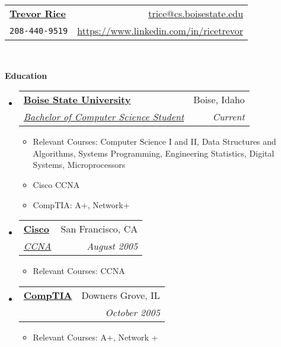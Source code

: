 \documentclass[letterpaper,11pt]{article}
\makeatletter
\newcommand{\resitem}[1]{\item #1 \vspace{-2pt}}
\newcommand{\resheading}[1]{{\large
    \colorbox{mygrey}{\begin{minipage}{\textwidth}{\textbf{#1
            \vphantom{p\^{E}}}}\end{minipage}}}}
\newcommand{\ressubheading}[4]{

  \begin{tabular*}{6.5in}{l@{\extracolsep{\fill}}r}
    \textbf{#1} & #2 \\
    \textit{#3} & \textit{#4} \\
  \end{tabular*}\vspace{-6pt}}
\makeatother
\begin{document}
\newcommand{\mywebheader}{
  \begin{tabular*}{7in}{l@{\extracolsep{\fill}}r}
    \textbf{\href{https://www.linkedin.com/in/ricetrevor}
    {\LARGE Trevor Rice}} & \href{mailto:trice@cs.boisestate.edu}{trice@cs.boisestate.edu}\\
    {\footnotesize \texttt{208-440-9519}} &
    \href{https://www.linkedin.com/in/ricetrevor} {https://www.linkedin.com/in/ricetrevor} \\
  \end{tabular*}
  \\
  \vspace{0.1in}}

\mywebheader

\resheading{Education}
\begin{itemize}
\item \ressubheading{\href{http://www.boisestate.edu}
		{Boise State University }}
		{Boise, Idaho }
		{\href{http://cs.boisestate.edu}
		{Bachelor of Computer Science Student}}
		{Current}
		{ \footnotesize
    \begin{itemize}
				\resitem{Relevant Courses: Computer Science I and II, Data Structures and
					Algorithms, Systems Programming, Engineering Statistics, Digital Systems,
					Microprocessors}

      \resitem{Cisco CCNA}
      \resitem{CompTIA: A+, Network+}


    \end{itemize}
		}

\item \ressubheading
	{\href{http://www.cisco.com/web/learning/certifications/associate/ccna/index.html}
		{Cisco }}{San Francisco, CA }{\href{http://www.cisco.com}{CCNA }}{    August 2005} { \footnotesize
    \begin{itemize}
      \resitem{Relevant Courses: CCNA}
    \end{itemize}
  }

\item \ressubheading
	{\href{http://certification.comptia.org}
		{CompTIA }}{Downers Grove, IL }{\href{http://www.comptia.org}{ }}{    October 2005} { \footnotesize
    \begin{itemize}
      \resitem{Relevant Courses: A+, Network +}
    \end{itemize}
  }

\end{itemize} %
\end{document}
